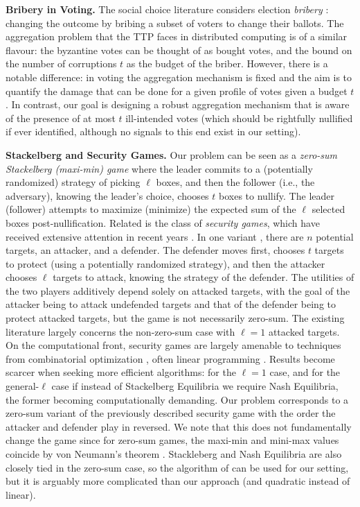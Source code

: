 \noindent \textbf{Bribery in Voting.} The social choice literature considers election \emph{bribery} \cite{Faliszewski_Rothe_2016}: changing the outcome 
by bribing a subset of voters to change their ballots. The aggregation problem that the TTP faces in distributed computing is of a similar flavour: the byzantine votes can be thought of as bought votes, and the bound on the number of corruptions $t$ as the budget of the briber. However, there is a notable difference: in voting the aggregation mechanism is fixed and the aim is to quantify the damage that can be done for a given profile of votes given a budget $t$. In contrast, our goal is designing a robust aggregation mechanism that is aware of the presence of at most $t$ ill-intended votes (which should be rightfully nullified if ever identified, although no signals to this end exist in our setting).

\noindent \textbf{Stackelberg and Security Games.} Our problem can be seen as a \emph{zero-sum Stackelberg (maxi-min) game} where the leader commits to a (potentially randomized) strategy of picking $\ell$ boxes, and then the follower (i.e., the adversary), knowing the leader's choice, chooses $t$ boxes to nullify. The leader (follower) attempts to maximize (minimize) the expected sum of the $\ell$ selected boxes post-nullification.
Related is the class of \emph{security games}, which have received extensive attention in recent years \cite{security_survey}. In one variant \cite{security_multiple_attackers}, there are $n$ potential targets, an attacker, and a defender. The defender moves first, chooses $t$ targets to protect (using a potentially randomized strategy), and then the attacker chooses $\ell$ targets to attack, knowing the strategy of the defender. The utilities of the two players additively depend solely on attacked targets, with the goal of the attacker being to attack undefended targets and that of the defender being to protect attacked
targets, but the game is not necessarily zero-sum. The existing literature largely concerns the non-zero-sum case with $\ell = 1$ attacked targets. On the computational front, security games are largely amenable to techniques from combinatorial optimization \cite{security_versus_combinatorial}, often linear programming \cite{conitzer_lp_security}. Results become scarcer when seeking more efficient algorithms: \cite{origami} for the $\ell = 1$ case, and \cite{security_multiple_attackers} for the general-$\ell$ case if instead of Stackelberg Equilibria we require Nash Equilibria, the former becoming computationally demanding. Our problem corresponds to a zero-sum variant of the previously described security game with the order the attacker and defender play in reversed. We note that this does not fundamentally change the game since for zero-sum games, the maxi-min and mini-max values coincide by von Neumann's theorem \cite{Neumann1928}. Stackleberg and Nash Equilibria are also closely tied in the zero-sum case, so the algorithm of \cite{security_multiple_attackers} can be used for our setting, but it is arguably more complicated than our approach (and quadratic instead of linear).


